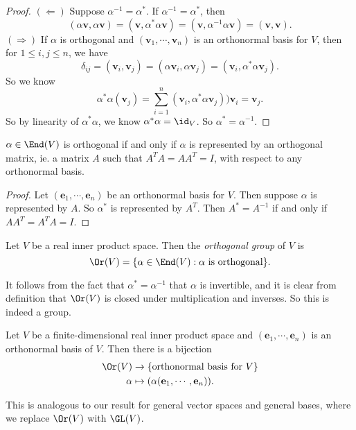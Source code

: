 \documentclass[a4paper]{article}
\begin{document}
\begin{proof}
  $(\Leftarrow)$ Suppose $\alpha^{-1} = \alpha^*$. If $\alpha^{-1} = \alpha^*$, then
  \[
    (\alpha \mathbf{v}, \alpha \mathbf{v}) = (\mathbf{v}, \alpha^* \alpha \mathbf{v}) = (\mathbf{v}, \alpha^{-1} \alpha \mathbf{v}) = (\mathbf{v}, \mathbf{v}).
  \]
  $(\Rightarrow)$ If $\alpha$ is orthogonal and $(\mathbf{v}_1, \cdots, \mathbf{v}_n)$ is an orthonormal basis for $V$, then for $1 \leq i, j \leq n$, we have
  \[
    \delta_{ij} = (\mathbf{v}_i, \mathbf{v}_j) = (\alpha \mathbf{v}_i, \alpha \mathbf{v}_j) = (\mathbf{v}_i, \alpha^* \alpha \mathbf{v}_j).
  \]
  So we know
  \[
    \alpha^* \alpha (\mathbf{v}_j) = \sum_{i = 1}^n (\mathbf{v}_i, \alpha^* \alpha \mathbf{v}_j)) \mathbf{v}_i = \mathbf{v}_j.
  \]
  So by linearity of $\alpha^* \alpha$, we know $\alpha^* \alpha = \id_V$. So $\alpha^* = \alpha^{-1}$.
\end{proof}

\begin{cor}
  $\alpha \in \End(V)$ is orthogonal if and only if $\alpha$ is represented by an orthogonal matrix, ie. a matrix $A$ such that $A^T A = AA^T = I$, with respect to any orthonormal basis.
\end{cor}

\begin{proof}
  Let $(\mathbf{e}_1, \cdots, \mathbf{e}_n)$ be an orthonormal basis for $V$. Then suppose $\alpha$ is represented by $A$. So $\alpha^*$ is represented by $A^T$. Then $A^* = A^{-1}$ if and only if $AA^T = A^T A = I$.
\end{proof}

\begin{defi}
  Let $V$ be a real inner product space. Then the \emph{orthogonal group} of $V$ is
  \[
    \Or(V) = \{\alpha \in \End(V): \alpha\text{ is orthogonal}\}.
  \]
\end{defi}
It follows from the fact that $\alpha^* = \alpha^{-1}$ that $\alpha$ is invertible, and it is clear from definition that $\Or(V)$ is closed under multiplication and inverses. So this is indeed a group.

\begin{prop}
  Let $V$ be a finite-dimensional real inner product space and $(\mathbf{e}_1, \cdots, \mathbf{e}_n)$ is an orthonormal basis of $V$. Then there is a bijection
  \begin{align*}
    \Or(V) &\to \{\text{orthonormal basis for }V\}\\
    \alpha &\mapsto (\alpha(\mathbf{e}_1, \cdots, \mathbf{e}_n)).
  \end{align*}
\end{prop}
This is analogous to our result for general vector spaces and general bases, where we replace $\Or(V)$ with $\GL(V)$.
\end{document}

